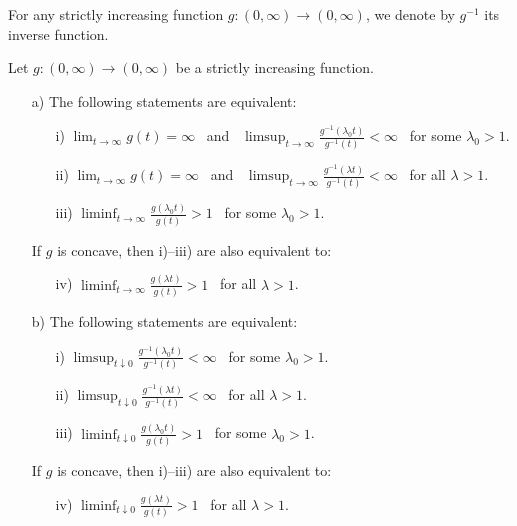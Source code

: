 \documentclass{aptpub}
\numberwithin{equation}{section}
\begin{document}
For any strictly increasing function $g:(0,\infty)\to(0,\infty)$, we denote by $g^{-1}$ its inverse function.
\begin{lem}\label{inverse}
Let $g:(0,\infty)\to(0,\infty)$ be a strictly increasing function.
\begin{enumerate}
\item[\upshape a)]
    The following statements are equivalent:
    \begin{enumerate}
    \item[\upshape i)]
        $\displaystyle\lim_{t\to\infty}g(t)=\infty$
        \ and \
        $\displaystyle\limsup_{t\to\infty}\frac{g^{-1}(\lambda_0t)}{g^{-1}(t)}<\infty$
        \ for some $\lambda_0>1$.

        \item[\upshape ii)]
        $\displaystyle\lim_{t\to\infty}g(t)=\infty$
        \ and \
        $\displaystyle\limsup_{t\to\infty}\frac{g^{-1}(\lambda t)}{g^{-1}(t)}<\infty$
        \ for all $\lambda>1$.

        \item[\upshape iii)]
            $\displaystyle\liminf_{t\to\infty}\frac{g(\lambda_0t)}{g(t)}>1$
            \ for some $\lambda_0>1$.
        \end{enumerate}
    If $g$ is concave, then \textup{i)--iii)} are also equivalent to:
        \begin{enumerate}
        \item[\upshape iv)]
        $\displaystyle\liminf_{t\to\infty}\frac{g(\lambda t)}{g(t)}>1$
        \ for all $\lambda>1$.
        \end{enumerate}

\item[\upshape b)]
    The following statements are equivalent:
        \begin{enumerate}
        \item[\upshape i)]
        $\displaystyle\limsup_{t\downarrow0}\frac{g^{-1}(\lambda_0t)}{g^{-1}(t)}<\infty$
        \ for some $\lambda_0>1$.

        \item[\upshape ii)]
        $\displaystyle\limsup_{t\downarrow0}\frac{g^{-1}(\lambda t)}{g^{-1}(t)}<\infty$
        \ for all $\lambda>1$.

        \item[\upshape iii)]
        $\displaystyle\liminf_{t\downarrow0}\frac{g(\lambda_0t)}{g(t)}>1$
        \ for some $\lambda_0>1$.
        \end{enumerate}
    If $g$ is concave, then \textup{i)--iii)} are also equivalent to:
        \begin{enumerate}
        \item[\upshape iv)]
        $\displaystyle\liminf_{t\downarrow0}\frac{g(\lambda t)}{g(t)}>1$
        \ for all $\lambda>1$.
        \end{enumerate}
    \end{enumerate}
\end{lem}
\end{document}
